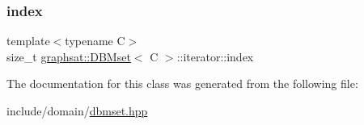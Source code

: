 \subsubsection{\texorpdfstring{index}{index}}
{\footnotesize\ttfamily template$<$typename C$>$ \\
size\+\_\+t \mbox{\hyperlink{classgraphsat_1_1_d_b_mset}{graphsat\+::\+D\+B\+Mset}}$<$ C $>$\+::iterator\+::index\hspace{0.3cm}{\ttfamily [protected]}}



The documentation for this class was generated from the following file\+:\begin{DoxyCompactItemize}
\item 
include/domain/\mbox{\hyperlink{dbmset_8hpp}{dbmset.\+hpp}}\end{DoxyCompactItemize}
